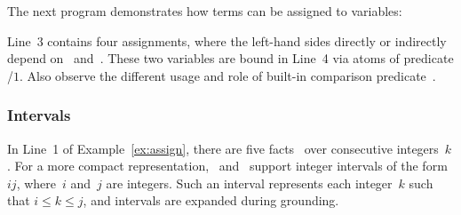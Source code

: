\begin{example}\label{ex:assign}
The next program demonstrates how terms can be assigned to variables:%
%

%
Line~3 contains four assignments, where the left-hand sides directly or indirectly
depend on~ and~.
These two variables are bound in Line~4 via atoms of predicate /$1$.
Also observe the different usage and role of built-in comparison predicate~\code{==}.
\eexample
\end{example}


\subsubsection{Intervals}\label{subsec:gringo:interval}

In Line~1 of Example~\ref{ex:assign},
there are five facts~
over consecutive integers~$k$.
For a more compact representation,
\gringo\ and \clingo\ support integer intervals of the form $i$$j$,
where~$i$ and~$j$ are integers.
Such an interval represents each integer~$k$ such that $i\leq k\leq j$,
and intervals are expanded during grounding.

